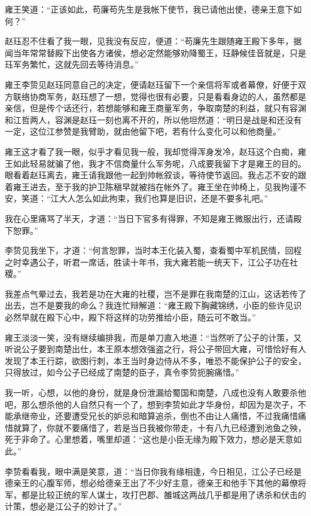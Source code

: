 雍王笑道：“正该如此，苟廉苟先生是我帐下使节，我已请他出使，德亲王意下如何？”

赵珏忍不住看了我一眼，见我没有反应，便道：“苟廉先生跟随雍王殿下多年，据闻当年常常替殿下出使各方诸侯，想必定然能够劝降蜀王，珏静候佳音就是，只是珏军务繁忙，这就先回去等待消息。”

雍王李贽见赵珏同意自己的决定，便请赵珏留下一个亲信将军或者幕僚，好便于双方联络协商军务，赵珏想了一想，觉得也很有必要，只是看看身边的人，虽然都是亲信，但是传个话还行，若想能够和雍王商量军务，争取南楚的利益，就只有容渊和江哲两人，容渊是赵珏一刻也离不开的，所以他坦然道：“明日是战是和还没有一定，这位江参赞是我臂助，就由他留下吧，若有什么变化可以和他商量。”

雍王这才看了我一眼，似乎才看见我一般，我却觉得浑身发冷，赵珏这个白痴，雍王如此轻易就骗了他，我才不信商量什么军务呢，八成要我留下才是雍王的目的。眼看着赵珏离去，雍王请我跟他一起到帅帐叙谈，等待使节返回。我忐忑不安的跟着雍王进去，至于我的护卫陈稹早就被挡在帐外了。雍王坐在帅椅上，见我拘谨不安，笑道：“江大人怎么如此拘束，我们也算是旧识，还是不要多礼吧。”

我在心里痛骂了半天，才道：“当日下官多有得罪，不知是雍王微服出行，还请殿下恕罪。”

李贽见我坐下，才道：“何言恕罪，当时本王化装入蜀，查看蜀中军机民情，回程之时幸遇公子，听君一席话，胜读十年书，我大雍若能一统天下，江公子功在社稷。”

我差点气晕过去，我若是功在大雍的社稷，岂不是罪在我南楚的江山，这话若传了出去，岂不是要我的命么？我连忙辩解道：“雍王殿下胸藏锦绣，小臣的些许见识必然早就在殿下心中，殿下将这样的功劳推给小臣，随云可不敢当。”

雍王淡淡一笑，没有继续编排我，而是单刀直入地道：“当然听了公子的计策，又听说公子要到南楚出仕，本王原本想效强盗之行，将公子带回大雍，可惜恰好有人发现了本王行踪，欲图行刺，本王当时身边侍从不多，唯恐不能保护公子的安全，只得放过，如今公子已经成了南楚的臣子，真令李贽扼腕痛惜。”

我一听，心想，以他的身份，就是身份泄漏给蜀国和南楚，八成也没有人敢要杀他吧，那么想杀他的人自然只有一个了，想到李贽如此才华身份，却因为是次子，不能承继帝业，还要遭受兄长的妒忌和暗算追杀，倒也不由让人痛惜，不过我痛惜痛惜就算了，你就不要痛惜了，若是当日我被你带走，十有八九已经遭到池鱼之殃，死于非命了。心里想着，嘴里却道：“这也是小臣无缘为殿下效力，想必是天意如此。”

李贽看看我，眼中满是笑意，道：“当日你我有缘相逢，今日相见，江公子已经是德亲王的心腹军师，想必给德亲王出了不少好主意，德亲王和他手下其他的幕僚将军，都是比较正统的军人谋士，攻打巴郡、雒城这两战几乎都是用了诱杀和伏击的计策，想必是江公子的妙计了。”

